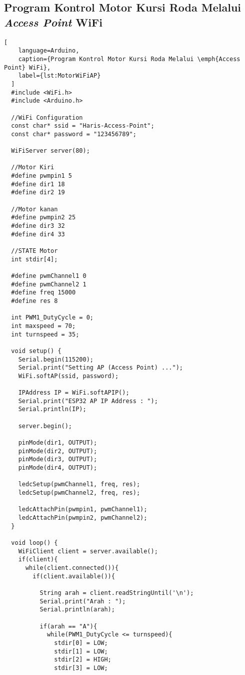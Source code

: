 \subsection*{Program Kontrol Motor Kursi Roda Melalui \emph{Access Point} WiFi}

\begin{lstlisting}[
    language=Arduino,
    caption={Program Kontrol Motor Kursi Roda Melalui \emph{Access Point} WiFi},
    label={lst:MotorWiFiAP}
  ]
  #include <WiFi.h>
  #include <Arduino.h>
  
  //WiFi Configuration
  const char* ssid = "Haris-Access-Point";
  const char* password = "123456789";
  
  WiFiServer server(80);
  
  //Motor Kiri
  #define pwmpin1 5
  #define dir1 18
  #define dir2 19
  
  //Motor kanan
  #define pwmpin2 25
  #define dir3 32
  #define dir4 33
  
  //STATE Motor
  int stdir[4];
  
  #define pwmChannel1 0
  #define pwmChannel2 1
  #define freq 15000
  #define res 8
  
  int PWM1_DutyCycle = 0;
  int maxspeed = 70;
  int turnspeed = 35;
  
  void setup() {
    Serial.begin(115200);
    Serial.print("Setting AP (Access Point) ...");
    WiFi.softAP(ssid, password);
  
    IPAddress IP = WiFi.softAPIP();
    Serial.print("ESP32 AP IP Address : ");
    Serial.println(IP);
  
    server.begin();
  
    pinMode(dir1, OUTPUT);
    pinMode(dir2, OUTPUT);
    pinMode(dir3, OUTPUT);
    pinMode(dir4, OUTPUT);
  
    ledcSetup(pwmChannel1, freq, res);
    ledcSetup(pwmChannel2, freq, res);
  
    ledcAttachPin(pwmpin1, pwmChannel1);
    ledcAttachPin(pwmpin2, pwmChannel2);
  }
  
  void loop() {
    WiFiClient client = server.available();
    if(client){
      while(client.connected()){
        if(client.available()){
  
          String arah = client.readStringUntil('\n');
          Serial.print("Arah : ");
          Serial.println(arah);
  
          if(arah == "A"){
            while(PWM1_DutyCycle <= turnspeed){
              stdir[0] = LOW;
              stdir[1] = LOW;
              stdir[2] = HIGH;
              stdir[3] = LOW;
  

\end{lstlisting}
